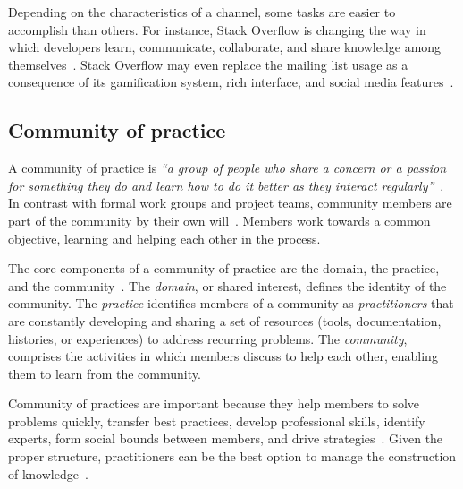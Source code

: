 Depending on the characteristics of a channel, some tasks are easier to accomplish than others.
For instance, Stack Overflow is changing the way in which developers learn, communicate, collaborate, and share knowledge among themselves~\cite{Storey2014}.
Stack Overflow may even replace the mailing list usage as a consequence of its gamification system, rich interface, and social media features~\cite{Vasilescu2014b}.


\subsection{Community of practice}


    A community of practice is \textit{``a group of people who share a concern or a passion for something they do and learn how to do it better as they interact regularly''}~\cite{Wenger2000}.
    In contrast with formal work groups and project teams, community members are part of the community by their own will~\cite{Wenger2000}.
    Members work towards a common objective, learning and helping each other in the process.

    The core components of a community of practice are the domain, the practice, and the community~\cite{Wenger2011}.
    The \textit{domain}, or shared interest, defines the identity of the community.
    The \textit{practice} identifies members of a community as \textit{practitioners} that are constantly developing and sharing a set of resources (tools, documentation, histories, or experiences) to address recurring problems. 
    The \textit{community}, comprises the activities in which members discuss to help each other, enabling them to learn from the community.

    Community of practices are important because they help members to solve problems quickly, transfer best practices, develop professional skills, identify experts, form social bounds between members, and drive strategies~\cite{Wenger2011, Storey2014}.
    Given the proper structure, practitioners can be the best option to manage the construction of knowledge~\cite{Wenger2011}.

